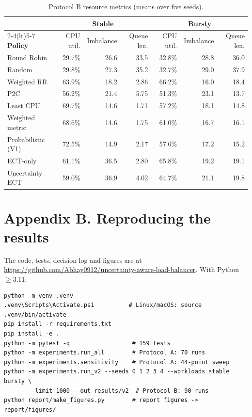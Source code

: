 \documentclass[11pt,a4paper]{article}
\newcommand{\repourl}{\url{https://github.com/Abhay0912/uncertainty-aware-load-balancer}}
\begin{document}
\begin{table}[H]
\caption{Protocol B resource metrics (means over five seeds).}\label{tab:resources}
\centering
\small
\begin{tabular}{lrrrrrr}
\toprule
& \multicolumn{3}{c}{\textbf{Stable}} & \multicolumn{3}{c}{\textbf{Bursty}}\\
\cmidrule(lr){2-4}\cmidrule(lr){5-7}
\textbf{Policy} & CPU util. & Imbalance & Queue len. & CPU util. & Imbalance & Queue len.\\
\midrule
Round Robin        & 29.7\% & 26.6 & 33.5 & 32.8\% & 28.8 & 36.0\\
Random             & 29.8\% & 27.3 & 35.2 & 32.7\% & 29.0 & 37.9\\
Weighted RR        & 63.9\% & 18.2 & 2.86 & 66.2\% & 16.0 & 18.4\\
P2C                & 56.2\% & 21.4 & 5.75 & 51.3\% & 23.1 & 13.7\\
Least CPU          & 69.7\% & 14.6 & 1.71 & 57.2\% & 18.1 & 14.8\\
Weighted metric    & 68.6\% & 14.6 & 1.75 & 61.0\% & 16.7 & 16.1\\
Probabilistic (V1) & 72.5\% & 14.9 & 2.17 & 57.6\% & 17.2 & 15.2\\
ECT-only           & 61.1\% & 36.5 & 2.80 & 65.8\% & 19.2 & 19.1\\
Uncertainty ECT    & 59.0\% & 36.9 & 4.02 & 64.7\% & 21.1 & 19.8\\
\bottomrule
\end{tabular}
\end{table}

\section*{Appendix B. Reproducing the results}
The code, tests, decision log and figures are at \repourl. With Python $\ge 3.11$:
\begin{verbatim}
python -m venv .venv
.venv\Scripts\Activate.ps1          # Linux/macOS: source .venv/bin/activate
pip install -r requirements.txt
pip install -e .
python -m pytest -q                  # 159 tests
python -m experiments.run_all        # Protocol A: 70 runs
python -m experiments.sensitivity    # Protocol A: 44-point sweep
python -m experiments.run_v2 --seeds 0 1 2 3 4 --workloads stable bursty \
       --limit 1000 --out results/v2  # Protocol B: 90 runs
python report/make_figures.py        # report figures -> report/figures/
\end{verbatim}
\end{document}
